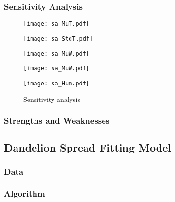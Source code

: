 \documentclass[12pt]{article}
\begin{document}
		\subsubsection{Sensitivity Analysis}
		
			\begin{figure}
				\centering
				\begin{minipage}{0.04\textwidth}\end{minipage}
				\begin{minipage}{0.46\textwidth}
					\texttt{[image: sa\_MuT.pdf]}
				\end{minipage}
				\begin{minipage}{0.46\textwidth}
					\texttt{[image: sa\_StdT.pdf]}
				\end{minipage}
				\begin{minipage}{0.04\textwidth}\end{minipage}
				
				\begin{minipage}{0.04\textwidth}\end{minipage}
				\begin{minipage}{0.46\textwidth}
					\texttt{[image: sa\_MuW.pdf]}
				\end{minipage}
				\begin{minipage}{0.46\textwidth}
					\texttt{[image: sa\_MuW.pdf]}
				\end{minipage}
				\begin{minipage}{0.04\textwidth}\end{minipage}
				
				\texttt{[image: sa\_Hum.pdf]}
				\caption{Sensitivity analysis}
				\label{fig:sa}
			\end{figure}
			
		\subsubsection{Strengths and Weaknesses}
		
	\subsection{Dandelion Spread Fitting Model}
		
		\subsubsection{Data}
		
		\subsubsection{Algorithm}
		
\end{document}

